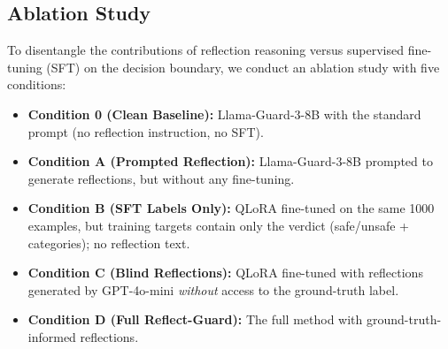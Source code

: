 \documentclass[superintelligence,article,accept,moreauthors]{Definitions/mdpi}
\begin{document}
\subsection{Ablation Study}
\label{sec:ablation}

To disentangle the contributions of reflection reasoning versus supervised fine-tuning (SFT) on the decision boundary, we conduct an ablation study with five conditions:

\begin{itemize}[leftmargin=*, nosep]
  \item \textbf{Condition 0 (Clean Baseline):} Llama-Guard-3-8B with the standard prompt (no reflection instruction, no SFT).
  \item \textbf{Condition A (Prompted Reflection):} Llama-Guard-3-8B prompted to generate reflections, but without any fine-tuning.
  \item \textbf{Condition B (SFT Labels Only):} QLoRA fine-tuned on the same 1000 examples, but training targets contain only the verdict (safe/unsafe + categories); no reflection text.
  \item \textbf{Condition C (Blind Reflections):} QLoRA fine-tuned with reflections generated by GPT-4o-mini \emph{without} access to the ground-truth label.
  \item \textbf{Condition D (Full Reflect-Guard):} The full method with ground-truth-informed reflections.
\end{itemize}
\end{document}

